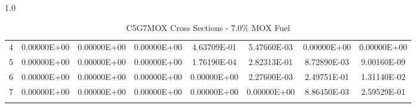\begin{sidewaysfigure}
\begin{table}[H]
\begin{subtable}[h]{1.0\textwidth}
{\begin{tabular}{*8c}
4 &	0.00000E+00	 &	0.00000E+00 &	0.00000E+00 &	4.63709E-01 &	5.47660E-03 &	0.00000E+00 &	0.00000E+00 \\
5 &	0.00000E+00	 &	0.00000E+00 &	0.00000E+00 &	1.76190E-04 &	2.82313E-01 &	8.72890E-03 &	9.00160E-09 \\
6 &	0.00000E+00	 &	0.00000E+00 &	0.00000E+00 &	0.00000E+00 &	2.27600E-03 &	2.49751E-01 &	1.31140E-02 \\
7 &	0.00000E+00	 &	0.00000E+00 &	0.00000E+00 &	0.00000E+00 &	0.00000E+00 &	8.86450E-03 &	2.59529E-01 \\
        \bottomrule
        & & & & & & & 
    \end{tabular}}
  \end{subtable}
  \caption{C5G7MOX Cross Sections - 7.0\% MOX Fuel}
          \label{table:MOX-7}
\end{table}
\end{sidewaysfigure}

